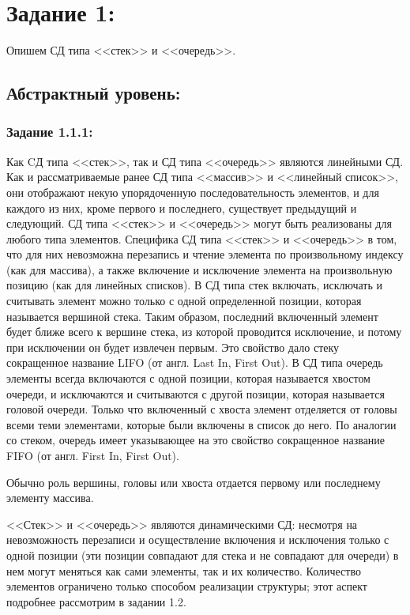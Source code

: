 \documentclass[12pt]{article}
\begin{document}
	\setcounter{secnumdepth}{-1} 
	\tableofcontents
	\newpage
	
	{\parskip=0.15cm
	
	\section{Задание 1:}
	\label{task_1}
	Опишем СД типа <<стек>> и <<очередь>>.
	
	\subsection{Абстрактный уровень:}
	\label{task_1_1}
	\subsubsection{Задание 1.1.1:}
	\label{task_1_1_1}
	
	Как CД типа <<стек>>, так и СД типа <<очередь>> являются линейными СД. Как и рассматриваемые ранее СД типа <<массив>> и <<линейный список>>, они отображают некую упорядоченную последовательность элементов, и для каждого из них, кроме первого и последнего, существует предыдущий и следующий. СД типа <<стек>> и <<очередь>> могут быть реализованы для любого типа элементов. Специфика СД типа <<стек>> и <<очередь>> в том, что для них невозможна перезапись и чтение элемента по произвольному индексу (как для массива), а также включение и исключение элемента на произвольную позицию (как для линейных списков). В СД типа стек включать, исключать и считывать элемент можно только с одной определенной позиции, которая называется вершиной стека. Таким образом, последний включенный элемент будет ближе всего к вершине стека, из которой проводится исключение, и потому при исключении он будет извлечен первым. Это свойство дало стеку сокращенное название LIFO (от англ. Last In, First Out). В СД типа очередь элементы всегда включаются с одной позиции, которая называется хвостом очереди, и исключаются и считываются с другой позиции, которая называется головой очереди. Только что включенный с хвоста элемент отделяется от головы всеми теми элементами, которые были включены в список до него. По аналогии со стеком, очередь имеет указывающее на это свойство сокращенное название FIFO (от англ. First In, First Out).
	
	Обычно роль вершины, головы или хвоста отдается первому или последнему элементу массива.
	
	<<Стек>> и <<очередь>> являются динамическими СД: несмотря на невозможность перезаписи и осуществление включения и исключения только с одной позиции (эти позиции совпадают для стека и не совпадают для очереди) в нем могут меняться как сами элементы, так и их количество. Количество элементов ограничено только способом реализации структуры; этот аспект подробнее рассмотрим в задании 1.2. 
	
}
\end{document}
